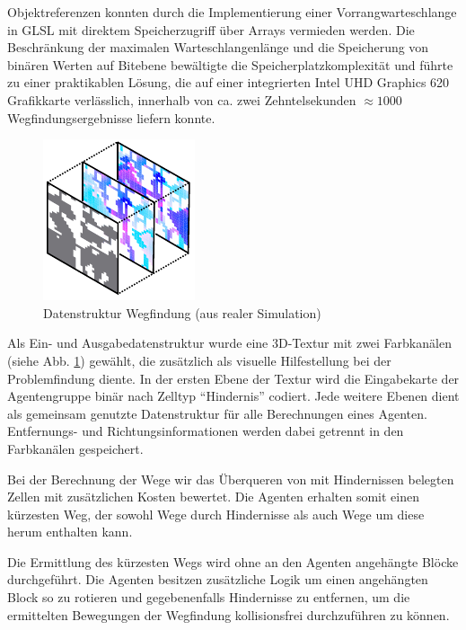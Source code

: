 \documentclass[runningheads]{llncs}
\begin{document}
Objektreferenzen konnten durch die Implementierung einer Vorrangwarteschlange in GLSL mit direktem Speicherzugriff über Arrays vermieden werden. Die Beschränkung der maximalen Warteschlangenlänge und die Speicherung von binären Werten auf Bitebene bewältigte die Speicherplatzkomplexität und führte zu einer praktikablen Lösung, die auf einer integrierten Intel UHD Graphics 620 Grafikkarte verlässlich, innerhalb von ca. zwei Zehntelsekunden $ \approx 1000$ Wegfindungsergebnisse liefern konnte.

\begin{figure}
\includegraphics{./Referenzen/Pathfinding.pdf}
\caption{Datenstruktur Wegfindung (aus realer Simulation)}
\label{pathfinding}
\end{figure}
Als Ein- und Ausgabedatenstruktur wurde eine 3D-Textur mit zwei Farbkanälen (siehe Abb. \ref{pathfinding}) gewählt, die zusätzlich als visuelle Hilfestellung bei der Problemfindung diente. In der ersten Ebene der Textur wird die Eingabekarte der Agentengruppe binär nach Zelltyp "`Hindernis"' codiert. Jede weitere Ebenen dient als gemeinsam genutzte Datenstruktur für alle Berechnungen eines Agenten. Entfernungs- und Richtungsinformationen werden dabei getrennt in den Farbkanälen gespeichert.

Bei der Berechnung der Wege wir das Überqueren von mit Hindernissen belegten Zellen mit zusätzlichen Kosten bewertet. Die Agenten erhalten somit einen kürzesten Weg, der sowohl Wege durch Hindernisse als auch Wege um diese herum enthalten kann.

Die Ermittlung des kürzesten Wegs wird ohne an den Agenten angehängte Blöcke durchgeführt. Die Agenten besitzen zusätzliche Logik um einen angehängten Block so zu rotieren und gegebenenfalls Hindernisse zu entfernen, um die ermittelten Bewegungen der Wegfindung kollisionsfrei durchzuführen zu können.
\end{document}
